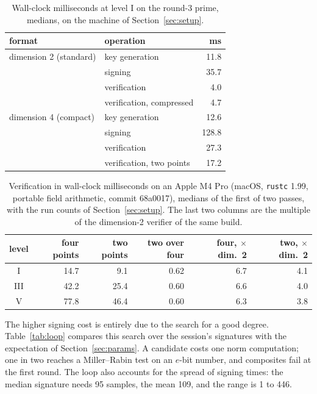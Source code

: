 \documentclass[version=preprint]{iacrcc}
\begin{document}
    \begin{table}[t]
        \centering
        \caption{Wall-clock milliseconds at level I on the round-3 prime, medians,
            on the machine of Section~\ref{sec:setup}.}
        \label{tab:ms}
        \small
        \setlength{\tabcolsep}{4pt}
        \begin{tabular}{l l r}
            \toprule
            format & operation & ms \\
            \midrule
            dimension 2 (standard) & key generation & 11.8 \\
            & signing & 35.7 \\
            & verification & 4.0 \\
            & verification, compressed & 4.7 \\
            \addlinespace
            dimension 4 (compact) & key generation & 12.6 \\
            & signing & 128.8 \\
            & verification & 27.3 \\
            & verification, two points & 17.2 \\
            \bottomrule
        \end{tabular}
    \end{table}

    \begin{table}[t]
        \centering
        \caption{Verification in wall-clock milliseconds on an Apple M4 Pro
            (macOS, \texttt{rustc} 1.99, portable field arithmetic, commit
            68a0017), medians of the first of two passes, with the run counts
            of Section~\ref{sec:setup}. The last two columns are the multiple
            of the dimension-2 verifier of the same build.}
        \label{tab:m4}
        \begin{tabular}{c r r r r r}
            \toprule
            level & four points & two points & two over four & four, $\times$ dim.\ 2 & two, $\times$ dim.\ 2 \\
            \midrule
            I   & 14.7 & 9.1 & 0.62 & 6.7 & 4.1 \\
            III & 42.2 & 25.4 & 0.60 & 6.6 & 4.0 \\
            V   & 77.8 & 46.4 & 0.60 & 6.3 & 3.8 \\
            \bottomrule
        \end{tabular}
    \end{table}

    The higher signing cost is entirely due to the search for a good degree.
    Table~\ref{tab:loop} compares this search over the session's signatures
    with the expectation of Section~\ref{sec:params}. A candidate costs one
    norm computation; one in two reaches a Miller--Rabin test on an $e$-bit
    number, and composites fail at the first round. The loop also accounts for
    the spread of signing times: the median signature needs 95 samples, the
    mean 109, and the range is 1 to 446.
\end{document}
